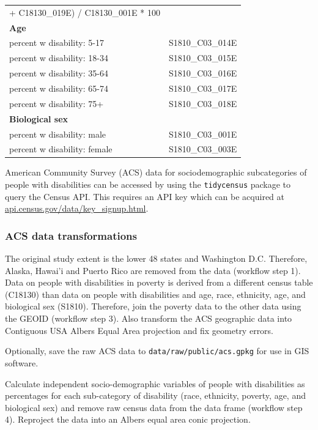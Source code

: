 \documentclass[
]{article}
\begin{document}
\begin{longtable}[]{@{}
  >{\centering\arraybackslash}p{}
  >{\centering\arraybackslash}p{}@{}}
+ C18130\_019E) / C18130\_001E * 100 \\
\textbf{Age} & \\
percent w disability: 5-17 & S1810\_C03\_014E \\
percent w disability: 18-34 & S1810\_C03\_015E \\
percent w disability: 35-64 & S1810\_C03\_016E \\
percent w disability: 65-74 & S1810\_C03\_017E \\
percent w disability: 75+ & S1810\_C03\_018E \\
\textbf{Biological sex} & \\
percent w disability: male & S1810\_C03\_001E \\
percent w disability: female & S1810\_C03\_003E \\
\end{longtable}

American Community Survey (ACS) data for sociodemographic subcategories
of people with disabilities can be accessed by using the
\texttt{tidycensus} package to query the Census API. This requires an
API key which can be acquired at
\href{https://api.census.gov/data/key_signup.html}{api.census.gov/data/key\_signup.html}.

\hypertarget{acs-data-transformations}{%
\subsubsection{ACS data
transformations}\label{acs-data-transformations}}

The original study extent is the lower 48 states and Washington D.C.
Therefore, Alaska, Hawai'i and Puerto Rico are removed from the data
(workflow step 1). Data on people with disabilities in poverty is
derived from a different census table (C18130) than data on people with
disabilities and age, race, ethnicity, age, and biological sex (S1810).
Therefore, join the poverty data to the other data using the GEOID
(workflow step 3). Also transform the ACS geographic data into
Contiguous USA Albers Equal Area projection and fix geometry errors.

Optionally, save the raw ACS data to \texttt{data/raw/public/acs.gpkg}
for use in GIS software.

Calculate independent socio-demographic variables of people with
disabilities as percentages for each sub-category of disability (race,
ethnicity, poverty, age, and biological sex) and remove raw census data
from the data frame (workflow step 4). Reproject the data into an Albers
equal area conic projection.
\end{document}

